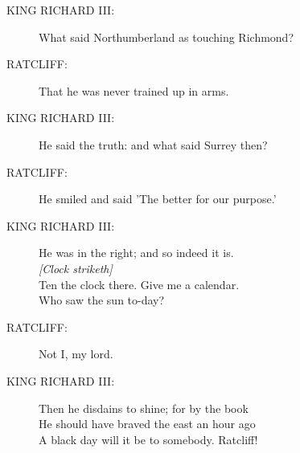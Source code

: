 \documentclass{article}
\begin{document}
\begin{description}
\item[KING RICHARD III:] 
\hspace{1pt}What said Northumberland as touching Richmond?\\
\end{description}
\begin{description}
\item[RATCLIFF:] 
\hspace{1pt}That he was never trained up in arms.\\
\end{description}
\begin{description}
\item[KING RICHARD III:] 
\hspace{1pt}He said the truth: and what said Surrey then?\\
\end{description}
\begin{description}
\item[RATCLIFF:] 
\hspace{1pt}He smiled and said 'The better for our purpose.'\\
\end{description}
\begin{description}
\item[KING RICHARD III:] 
\hspace{1pt}He was in the right; and so indeed it is.\\
{\it [Clock striketh]}\\
\hspace{1pt}Ten the clock there. Give me a calendar.\\
\hspace{1pt}Who saw the sun to-day?\\
\end{description}
\begin{description}
\item[RATCLIFF:] 
\hspace{1pt}Not I, my lord.\\
\end{description}
\begin{description}
\item[KING RICHARD III:] 
\hspace{1pt}Then he disdains to shine; for by the book\\
\hspace{1pt}He should have braved the east an hour ago\\
\hspace{1pt}A black day will it be to somebody. Ratcliff!\\
\end{description}
\end{document}
